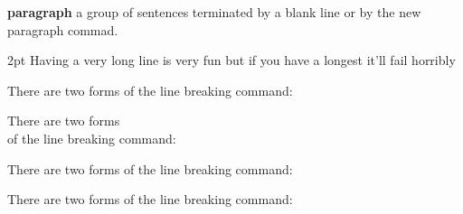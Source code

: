 \documentclass[draft,12pt,twocolumn]{article}
\begin{document}
\setlength{\hangindent}{30pt}
\noindent
\textbf{paragraph} a group of sentences terminated by a
blank line or by the new paragraph commad.
\medskip

\begin{setlength}{\hfuzz}{2pt}
Having a very long line is very fun but if you have a longest
 it'll fail horribly\\[15pt]
\end{setlength}

There are two forms of the line breaking command:

There are two forms\\ of the line breaking command:

There are two forms \newline of the line breaking command:

There are two forms \linebreak of the line breaking command:
\end{document}
